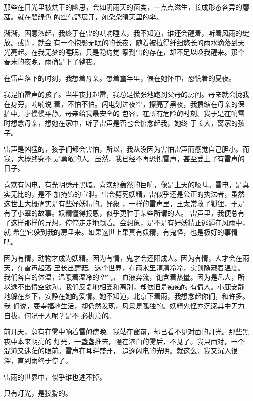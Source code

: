 \documentclass[12pt,a4paper]{article}
\begin{document}
		那些在日光里被烘干的幽思，会如阴雨天的菌类，一点点滋生，长成形态各异的蘑菇。就在碧绿色
	的空气舒展开，如朵朵晴天里的伞。

		渐渐，困意浓起，我终于在雷的哄响睡去，我不知道，谁还会醒着，听着风雨的绽放。或许，就会
	有一个抱影无眠的的长夜，随着被拉得纤细悠长的雨水滴落到天光亮起。在我无梦的睡眠，只是隐约觉
	察到雷的存在，却不足以唤我醒来。那个春末的夜晚，雨确是下了整夜。

		在雷声落下的时刻，我想着母亲。想着童年里，偎在她怀中，恐慌着的夏夜。

		我是怕雷声的孩子。当半夜打起雷，我总是慌张地跑到父母的房间。母亲就会拢我在身旁，喃喃说
	着，不怕不怕。闪电划过夜空，擦亮了黑夜，我攒缩在母亲的保护中，才慢慢平静。母亲给我最安全的
	包容，在所有危险的时刻。我于是在响雷时想念母亲，想她在家中，听了雷声是否也会惦念起我，她终
	于长大，离家的孩子。

		雷声是凶猛的，孩子们都会害怕，所以，我从没因为害怕雷声而感觉自己胆小。而我，大概终究不
	是勇敢的人。虽然，我已经不再恐惧雷声，甚至爱上了有雷声的日子。

		喜欢有闪电，有光明劈开黑暗。喜欢那轰然的巨响，像是上天的嚎叫。雷电，是真实无比的，是不
	加掩饰的宣泄。雷会劈死妖精，雷似乎还是公正的执法者，虽然这世上大概确实是有些好妖精的。好象
	，一样的雷声里，王太常救了狐狸，于是有了小翠的故事。妖精懂得报恩，似乎更胜于某些所谓的人。
	雷声里，我便总有了这样那样的异想，停停走走地飘着。会想象，是不是有好妖精正逃遁在风雨中，就
	希望它躲到我的房里来。如果这世上果真有妖精，有鬼怪，也是极好的事情吧。

		因为有情，动物才成为妖精。因为有情，鬼才会还阳成人。因为有情，人才会在雨天，在雷声起落
	里长出蘑菇。这个世界，在雨水里清清冷冷，实则隐藏着温度。我们各自的体温，温暖着湿冷的空气，
	血液奔流，饱含着热量。因为是凡人，所以逃不出情空欲海。我们反复地相爱和离别，却依旧是痴痴的
	有情人。小鹿安静地躲在乡下，安静在她的爱情。她不知道，北京下着雨，我想念起你们，和许多。我
	们说，要幸福地生活，却仍然发现，风景是孤独的。妖精鬼怪亦沉溺其中无力自拔，何况于人呢？是不
	必执意的。

		前几天，总有在雾中响着雷的傍晚。我站在窗前，却已看不见对面的灯光。那些黑夜中本来明亮的
	灯光，一盏盏推去，隐在浓白的雾后，不见了。我只面对，一个混沌又迷茫的眼前。雷声在耳畔盛开，
	追逐闪电的光明。就这么，我又沉入很深，直到雨终于停了。

		雷雨的世界中，似乎谁也逃不掉。

		只有灯光，是狡猾的。

	\endwriting


\end{document}
